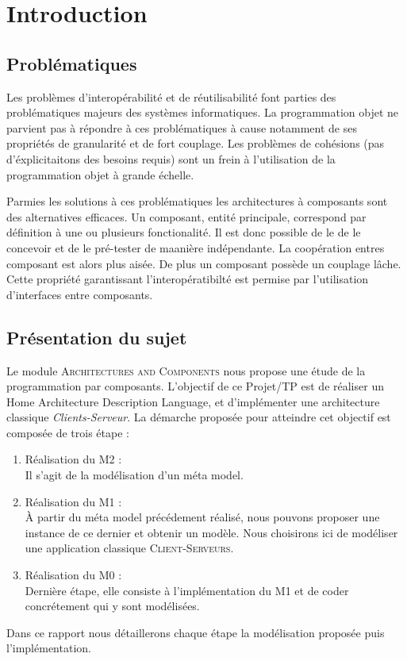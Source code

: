 \chapter{Introduction}

\section{Problématiques}
Les problèmes d'interopérabilité et de réutilisabilité font parties des problématiques majeurs des systèmes informatiques. La programmation objet ne parvient pas à répondre à ces problématiques à cause notamment de ses propriétés de granularité et de fort couplage. Les problèmes de cohésions (pas d'éxplicitaitons des besoins requis) sont un frein à l'utilisation de la programmation objet à grande échelle. 

Parmies les solutions à ces problématiques les architectures à composants sont des alternatives efficaces. Un composant, entité principale, correspond par définition à une ou plusieurs fonctionalité. Il est donc possible de le de le concevoir et de le pré-tester de maanière indépendante. La coopération entres composant est alors plus aisée. De plus un composant possède un couplage lâche. Cette propriété garantissant l'interopératibilté est permise par l'utilisation d'interfaces entre composants. 

\section{Présentation du sujet}
Le module \textsc{Architectures and Components} nous propose une étude de la programmation par composants. L'objectif de ce Projet/TP  est de réaliser un Home Architecture Description Language, et d'implémenter une architecture classique \emph{Clients-Serveur}. La démarche proposée pour atteindre cet objectif est composée de trois étape : 


\begin{enumerate}
\item 
Réalisation du M2 :\hfill \\
Il s'agit de la modélisation d'un méta model.  
\item
Réalisation du M1 :\hfill \\
À partir du méta model précédement réalisé, nous pouvons proposer une instance de ce dernier et obtenir un modèle. Nous choisirons ici de modéliser une application classique \textsc{Client-Serveurs}.  
\item
Réalisation du M0 :\hfill \\
Dernière étape, elle consiste à l'implémentation du M1 et de coder concrétement qui y sont modélisées.
\end{enumerate}

Dans ce rapport nous détaillerons chaque étape la modélisation proposée puis l'implémentation.
